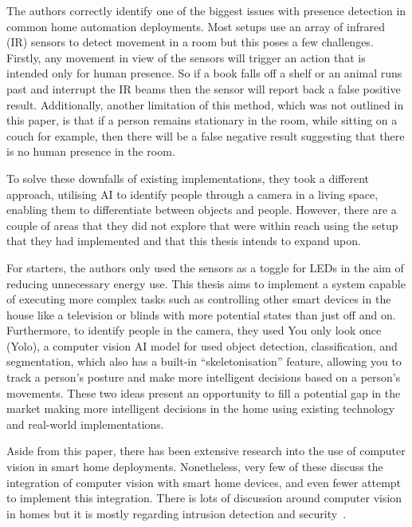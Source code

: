 The authors correctly identify one of the biggest issues with presence detection in common home automation deployments.
Most setups use an array of infrared (IR) sensors to detect movement in a room but this poses a few challenges.
Firstly, any movement in view of the sensors will trigger an action that is intended only for human presence.
So if a book falls off a shelf or an animal runs past and interrupt the IR beams then the sensor will report back a false positive result.
Additionally, another limitation of this method, which was not outlined in this paper, is that if a person remains stationary in the room, while sitting on a couch for example, then there will be a false negative result suggesting that there is no human presence in the room.

To solve these downfalls of existing implementations, they took a different approach, utilising AI to identify people through a camera in a living space, enabling them to differentiate between objects and people.
However, there are a couple of areas that they did not explore that were within reach using the setup that they had implemented and that this thesis intends to expand upon.

For starters, the authors only used the sensors as a toggle for LEDs in the aim of reducing unnecessary energy use.
This thesis aims to implement a system capable of executing more complex tasks such as controlling other smart devices in the house like a television or blinds with more potential states than just off and on.
Furthermore, to identify people in the camera, they used You only look once (Yolo), a computer vision AI model for used object detection, classification, and segmentation, which also has a built-in ``skeletonisation'' feature, allowing you to track a person's posture and make more intelligent decisions based on a person's movements.
These two ideas present an opportunity to fill a potential gap in the market making more intelligent decisions in the home using existing technology and real-world implementations.

Aside from this paper, there has been extensive research into the use of computer vision in smart home deployments.
Nonetheless, very few of these discuss the integration of computer vision with smart home devices, and even fewer attempt to implement this integration.
There is lots of discussion around computer vision in homes but it is mostly regarding intrusion detection and security~\cite{Cucc05,Garc17,Nand20,Patc15,Sefa14,Zhan19}.

